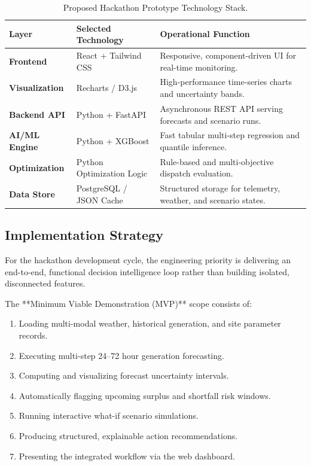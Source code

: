 \begin{table}[htbp]
    \centering
    \small
    \renewcommand{\arraystretch}{1.2}
    \caption{Proposed Hackathon Prototype Technology Stack.}
    \label{tab:tech_stack}
    \begin{tabularx}{\textwidth}{L{2.8cm} L{3.5cm} Y}
        \toprule
        \textbf{Layer} & \textbf{Selected Technology} & \textbf{Operational Function} \\
        \midrule
        \textbf{Frontend} & React + Tailwind CSS & Responsive, component-driven UI for real-time monitoring. \\
        \textbf{Visualization} & Recharts / D3.js & High-performance time-series charts and uncertainty bands. \\
        \textbf{Backend API} & Python + FastAPI & Asynchronous REST API serving forecasts and scenario runs. \\
        \textbf{AI/ML Engine} & Python + XGBoost & Fast tabular multi-step regression and quantile inference. \\
        \textbf{Optimization} & Python Optimization Logic & Rule-based and multi-objective dispatch evaluation. \\
        \textbf{Data Store} & PostgreSQL / JSON Cache & Structured storage for telemetry, weather, and scenario states. \\
        \bottomrule
    \end{tabularx}
\end{table}

\subsection{Implementation Strategy}
\label{subsec:implementation_strategy}

For the hackathon development cycle, the engineering priority is delivering an end-to-end, functional decision intelligence loop rather than building isolated, disconnected features.

The **Minimum Viable Demonstration (MVP)** scope consists of:
\begin{enumerate}[leftmargin=1.8em, itemsep=0.2em]
    \item Loading multi-modal weather, historical generation, and site parameter records.
    \item Executing multi-step 24--72 hour generation forecasting.
    \item Computing and visualizing forecast uncertainty intervals.
    \item Automatically flagging upcoming surplus and shortfall risk windows.
    \item Running interactive what-if scenario simulations.
    \item Producing structured, explainable action recommendations.
    \item Presenting the integrated workflow via the web dashboard.
\end{enumerate}

